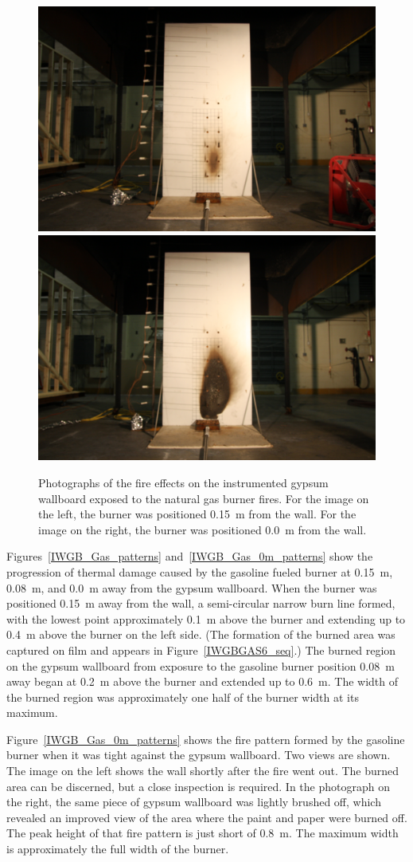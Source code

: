 \documentclass[twoside]{uocthesis}
\begin{document}
{\begin{figure}[p]
	\centering
	\includegraphics[trim=19.0in 5.0in 19.0in 15.0in, clip=true, width=0.4\columnwidth]{../Figures/IWGB_NG_0_15m}
	\includegraphics[trim=19.0in 5.0in 19.0in 15.0in, clip=true, width=0.4\columnwidth]{../Figures/IWGB_NG_0m} \\
	\caption[Photographs of the fire effects on the instrumented gypsum wallboard exposed to the natural gas burner fires]{Photographs of the fire effects on the instrumented gypsum wallboard exposed to the natural gas burner fires. For the image on the left, the burner was positioned 0.15~m from the wall.  For the image on the right, the burner was positioned 0.0~m from the wall.}
	\label{IWGB_NG_patterns}
\end{figure}

Figures~\ref{IWGB_Gas_patterns} and~\ref{IWGB_Gas_0m_patterns} show the progression of thermal damage caused by the gasoline fueled burner at 0.15~m, 0.08~m, and 0.0~m away from the gypsum wallboard.  When the burner was positioned 0.15~m away from the wall, a semi-circular narrow burn line formed, with the lowest point approximately 0.1~m above the burner and extending up to 0.4~m above the burner on the left side.  (The formation of the burned area was captured on film and appears in Figure~\ref{IWGBGAS6_seq}.)  The burned region on the gypsum wallboard from exposure to the gasoline burner position 0.08~m away began at 0.2~m above the burner and extended up to 0.6~m. The width of the burned region was approximately one half of the burner width at its maximum.  

Figure~\ref{IWGB_Gas_0m_patterns} shows the fire pattern formed by the gasoline burner when it was tight against the gypsum wallboard.  Two views are shown.  The image on the left shows the wall shortly after the fire went out.  The burned area can be discerned, but a close inspection is required.  In the photograph on the right, the same piece of gypsum wallboard was lightly brushed off, which revealed an improved view of the area where the paint and paper were burned off.  The peak height of that fire pattern is just short of 0.8~m. The maximum width is approximately the full width of the burner.         

}
\end{document}
